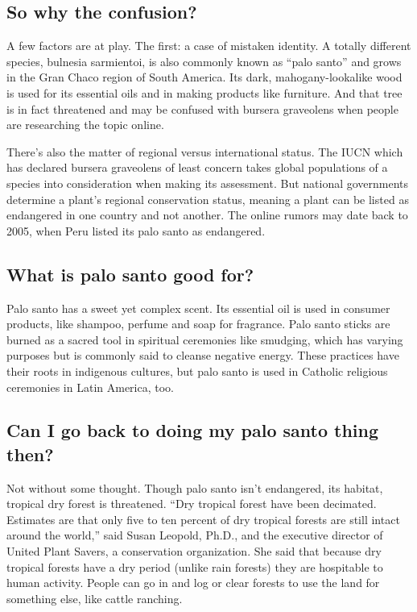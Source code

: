 \hypertarget{so-why-the-confusion}{%
\subsection{So why the confusion?}\label{so-why-the-confusion}}

A few factors are at play. The first: a case of mistaken identity. A
totally different species, bulnesia sarmientoi, is also commonly known
as ``palo santo'' and grows in the Gran Chaco region of South America.
Its dark, mahogany-lookalike wood is used for its essential oils and in
making products like furniture. And that tree is in fact threatened and
may be confused with bursera graveolens when people are researching the
topic online.

There's also the matter of regional versus international status. The
IUCN which has declared bursera graveolens of least concern takes global
populations of a species into consideration when making its assessment.
But national governments determine a plant's regional conservation
status, meaning a plant can be listed as endangered in one country and
not another. The online rumors may date back to 2005, when Peru listed
its palo santo as endangered.

\hypertarget{what-is-palo-santo-good-for}{%
\subsection{What is palo santo good
for?}\label{what-is-palo-santo-good-for}}

Palo santo has a sweet yet complex scent. Its essential oil is used in
consumer products, like shampoo, perfume and soap for fragrance. Palo
santo sticks are burned as a sacred tool in spiritual ceremonies like
smudging, which has varying purposes but is commonly said to cleanse
negative energy. These practices have their roots in indigenous
cultures, but palo santo is used in Catholic religious ceremonies in
Latin America, too.

\hypertarget{can-i-go-back-to-doing-my-palo-santo-thing-then}{%
\subsection{Can I go back to doing my palo santo thing
then?}\label{can-i-go-back-to-doing-my-palo-santo-thing-then}}

Not without some thought. Though palo santo isn't endangered, its
habitat, tropical dry forest is threatened. ``Dry tropical forest have
been decimated. Estimates are that only five to ten percent of dry
tropical forests are still intact around the world,'' said Susan
Leopold, Ph.D., and the executive director of United Plant Savers, a
conservation organization. She said that because dry tropical forests
have a dry period (unlike rain forests) they are hospitable to human
activity. People can go in and log or clear forests to use the land for
something else, like cattle ranching.

